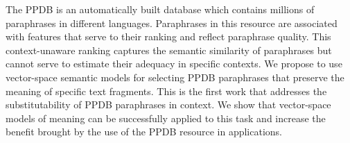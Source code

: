 The PPDB is an automatically built database which contains millions of paraphrases in different languages. Paraphrases in this resource are associated with features that serve to their ranking and reflect paraphrase quality. This context-unaware ranking captures the semantic similarity of paraphrases but cannot serve to estimate their adequacy in specific contexts. We propose to use vector-space semantic models for selecting PPDB paraphrases that preserve the meaning of specific text fragments. This is the first work that addresses the substitutability of PPDB paraphrases in context. We show that vector-space models of meaning can be successfully applied to this task and increase the benefit brought by the use of the PPDB resource in applications.
